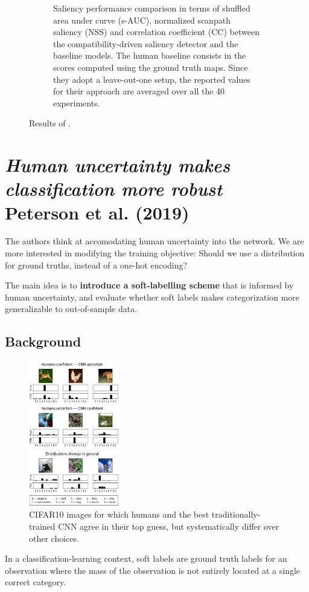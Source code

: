 \begin{figure}[!ht]
\begin{subfigure}{.49\textwidth}
        \caption{ Saliency performance comparison in terms of shuffled area under curve (s-AUC), normalized scanpath saliency (NSS) and correlation coefficient (CC) between the compatibility-driven saliency detector and the baseline models. The human baseline consists in the scores computed using the ground truth maps. Since they adopt a leave-out-one setup, the reported values for their approach are averaged over all the 40 experiments.}
        \label{fig:palazzo_4}
    \end{subfigure}
    \caption{Results of \cite{palazzo2020decoding}.}
    \label{fig:palazzo_res}
\end{figure}

\section[Accommodating human uncertainty]{\textit{Human uncertainty makes classification more robust}\\ Peterson et al. (2019)}
The authors think at accomodating human uncertainty into the network.
We are more interested in modifying the training objective: Should we use a distribution for ground truths, instead of a one-hot encoding?

The main idea is to \textbf{introduce a soft-labelling scheme} that is informed by human uncertainty, and evaluate whether soft labels makes categorization more generalizable to out-of-sample data.

\subsection{Background}

\begin{figure}
  \centering
  \includegraphics[width=0.35\textwidth]{images/peterson.png}
  \caption{CIFAR10 images for which humans and the best traditionally-trained CNN agree in their top guess, but systematically differ over other choices.}
  \label{fig:peterson}
\end{figure}
In a classification-learning context, soft labels are ground truth labels for an observation where the mass of the observation is not entirely located at a single correct category.

